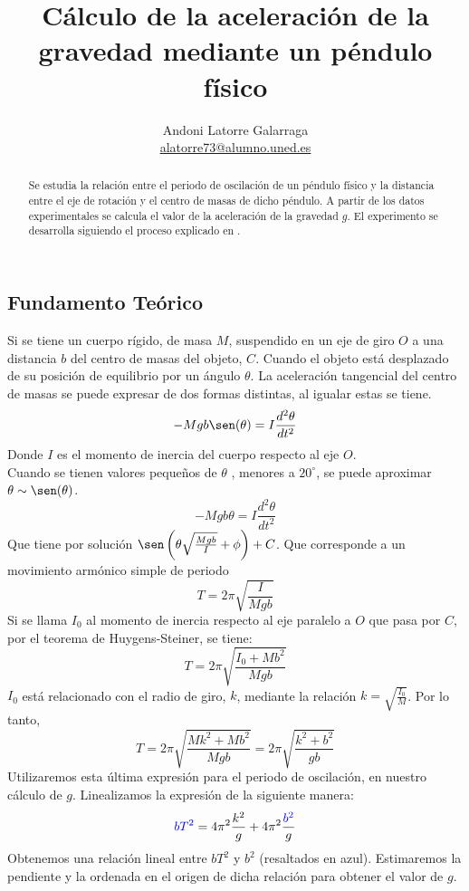 \documentclass{article}
\title{Cálculo de la aceleración de la gravedad mediante un péndulo físico}
\author{Andoni Latorre Galarraga \\ \href{mailto:alatorre73@alumno.uned.es}{alatorre73@alumno.uned.es}}
\date{}
\begin{document}
\maketitle
\begin{abstract}
Se estudia la relación entre el periodo de oscilación de un péndulo físico y la distancia entre el eje de rotación y el centro de masas de dicho péndulo. A partir de los datos experimentales se calcula el valor de la aceleración de la gravedad $g$. El experimento se desarrolla siguiendo el proceso explicado en \cite{web}.
\end{abstract}

\begin{multicols}{2}

\section*{Fundamento Teórico}
Si se tiene un cuerpo rígido, de masa $M$, suspendido en un eje de giro $O$ a una distancia $b$ del centro de masas del objeto, $C$. Cuando el objeto está desplazado de su posición de equilibrio por un ángulo $\theta$. La aceleración tangencial del centro de masas se puede expresar de dos formas distintas, al igualar estas se tiene.
$$
-M g b \sen(\theta) = I \frac{d^2 \theta}{dt^2}
$$
Donde $I$ es el momento de inercia del cuerpo respecto al eje $O$.\\
Cuando se tienen valores pequeños de $\theta$ , menores a $20^\circ$, se puede aproximar $\theta \sim \sen(\theta)$.
$$
-M g b \theta = I \frac{d^2 \theta}{dt^2}
$$
Que tiene por solución $\sen \left( \theta \sqrt{\frac{Mgb}{I}} + \phi \right) + C$. Que corresponde a un movimiento armónico simple de periodo
$$
T = 2\pi \sqrt{\frac{I}{Mgb}}
$$
Si se llama $I_0$ al momento de inercia respecto al eje paralelo a $O$ que pasa por $C$, por el teorema de Huygens-Steiner, se tiene:
$$
T = 2\pi \sqrt{\frac{I_0 + Mb^2}{Mgb}}
$$
$I_0$ está relacionado con el radio de giro, $k$, mediante la relación $k = \sqrt{\frac{I_0}{M}}$. Por lo tanto,
$$
T = 2\pi \sqrt{\frac{Mk^2 + Mb^2}{Mgb}} = 2\pi \sqrt{\frac{k^2 + b^2}{gb}}
$$
Utilizaremos esta última expresión para el periodo de oscilación, en nuestro cálculo de $g$. Linealizamos la expresión de la siguiente manera:
$$
\textcolor{blue}{bT^2} = 4\pi^2 \frac{k^2}{g} + 4\pi^2 \frac{\textcolor{blue}{b^2}}{g}
$$
Obtenemos una relación lineal entre $bT^2$ y $b^2$ (resaltados en azul). Estimaremos la pendiente y la ordenada en el origen de dicha relación para obtener el valor de $g$.


\end{multicols}
\end{document}
